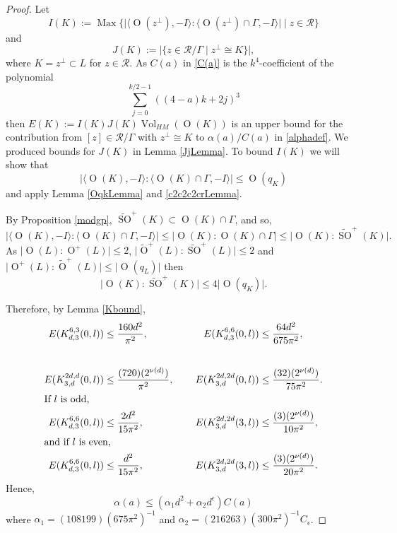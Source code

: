 \documentclass[12pt, a4paper]{article}
\newcommand{\la}{\langle}
\newcommand{\ra}{\rangle}
\newcommand{\rc}{\mathcal{R}}
\newcommand{\opn}{\operatorname}
\begin{document}
\begin{proof}
Let
\[
I(K) := \opn{Max} \{ \vert \la \opn{O}(z^{\perp}), -I \ra : \la \opn{O}(z^{\perp}) \cap \Gamma , -I \ra \vert \mid z \in \rc \} 
\]
and 
\[
J(K) := \vert \{ z \in \rc / \Gamma \mid z^{\perp} \cong K \} \vert,  
\]
where $K=z^{\perp} \subset L$ for $z \in \rc$. 
As $C(a)$ in \eqref{C(a)}
is the $k^4$-coefficient of the polynomial
\[
\sum_{j=0}^{k/2 - 1} ((4-a)k + 2j)^3
\]
then $E(K):=I(K) J(K) \opn{Vol}_{HM}(\opn{O}(K))$ is an upper bound for the contribution from $[z] \in \rc/\Gamma$ with $z^{\perp} \cong K$ to $\alpha(a)/C(a)$ in \eqref{alphadef}.
We produced bounds for $J(K)$ in Lemma \ref{JjLemma}.
To bound $I(K)$ we will show that
\[
\vert \la \opn{O}(K), -I \ra : \la \opn{O}(K) \cap \Gamma, -I \ra \vert \leq \opn{O}(q_K)
\]
and apply Lemma \ref{OqkLemma} and \ref{c2c2c2crLemma}.

By Proposition \ref{modgp}, $\widetilde{\opn{SO}}^+(K) \subset \opn{O}(K) \cap \Gamma$, and so, 
\[
  \vert \la \opn{O}(K), -I \ra : \la \opn{O}(K) \cap \Gamma, -I \ra \vert
  \leq
  \vert \opn{O}(K) : \opn{O}(K) \cap \Gamma \vert
  \leq
  \vert \opn{O}(K) : \widetilde{\opn{SO}}^+(K) \vert.
\]
As
$\vert \opn{O}(L) : \opn{O}^+(L) \vert \leq 2$,
$\vert \widetilde{\opn{O}}^+(L) : \widetilde{\opn{SO}}^+(L) \vert \leq 2$
and
$\vert \opn{O}^+(L) : \widetilde{\opn{O}}^+(L) \vert \leq \vert \opn{O}(q_L) \vert$ 
then
\begin{equation}\label{OKStOKbound}
\vert \opn{O}(K) : \widetilde{\opn{SO}}^+(K) \vert
  \leq
  4 \vert \opn{O}(q_K) \vert.
\end{equation}

Therefore, by Lemma \ref{Kbound}, 
\begin{align*}
E(K_{d,3}^{6,3}(0,l))  & \leq \dfrac{160 d^2}{\pi^2}, 
  & & \text{   } & 
E(K_{d,3}^{6,6}(0,l))  &\leq \dfrac{64 d^2}{675 \pi^2},  \\[20pt]
E(K_{3,d}^{2d,d}(0,l)) &\leq \dfrac{(720)(2^{\nu(d)})}{\pi^2},   
& & \text{   } & 
    E(K_{3,d}^{2d,2d}(0,l)) &\leq \dfrac{(32)(2^{\nu(d)})}{75 \pi^2}. \\
\intertext{If $l$ is odd,}
E(K_{d,3}^{6,6}(0,l)) &\leq \dfrac{2 d^2}{15 \pi^2}, 
&& \text{   } &
E(K_{3,d}^{2d,2d}(3,l)) &\leq \dfrac{(3)(2^{\nu(d)})}{10 \pi^2}, \\
\intertext{and if $l$ is even,}
E(K_{d,3}^{6,6}(0,l)) &\leq \dfrac{d^2}{15 \pi^2}, 
&& \text{   } &
    E(K_{3,d}^{2d,2d}(3,l)) &\leq \dfrac{(3)(2^{\nu(d)})}{20 \pi^2}.
\end{align*}
    Hence, 
\[
\alpha(a) \leq
\left (
\alpha_1 d^2 +
\alpha_2 d^{\epsilon}
\right )
C(a)
\]
where
  $\alpha_1 = (108199)(675 \pi^2)^{-1}$ and
  $\alpha_2 = (216263)(300 \pi^2)^{-1}C_{\epsilon}$.
\end{proof}
\end{document}
